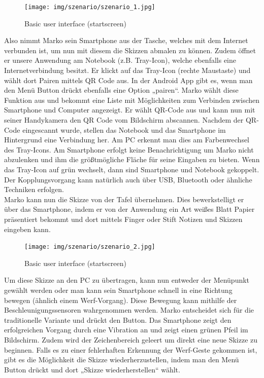 \documentclass{chi-ext}
\begin{document}
\begin{figure}
  \centering
  \texttt{[image: img/szenario/szenario\_1.jpg]}
  \caption{Basic user interface (startscreen)}
  \label{fig:mockup_startscreen}
\end{figure}

Also nimmt Marko sein Smartphone aus der Tasche, welches mit dem Internet verbunden ist, um nun mit diesem die Skizzen abmalen zu können. Zudem öffnet er unsere Anwendung am Notebook (z.B. Tray-Icon), welche ebenfalls eine Internetverbindung besitzt. Er klickt auf das Tray-Icon (rechte Maustaste) und wählt dort Pairen mittels QR Code aus. In der Android App gibt es, wenn man den Menü Button drückt ebenfalls eine Option „pairen“. Marko wählt diese Funktion aus und bekommt eine Liste mit Möglichkeiten zum Verbinden zwischen Smartphone und Computer angezeigt. Er wählt QR-Code aus und kann nun mit seiner Handykamera den QR Code vom Bildschirm abscannen. Nachdem der QR-Code eingescannt wurde, stellen das Notebook und das Smartphone im Hintergrund eine Verbindung her. Am PC erkennt man dies am Farbenwechsel des Tray-Icons. Am Smartphone erfolgt keine Benachrichtigung um Marko nicht abzulenken und ihm die größtmögliche Fläche für seine Eingaben zu bieten. Wenn das Tray-Icon auf grün wechselt, dann sind Smartphone und Notebook gekoppelt. Der Kopplungsvorgang kann natürlich auch über USB, Bluetooth oder ähnliche Techniken erfolgen.\\
Marko kann nun die Skizze von der Tafel übernehmen. Dies bewerkstelligt er über das Smartphone, indem er von der Anwendung ein Art weißes Blatt Papier präsentiert bekommt und dort mittels Finger oder Stift Notizen und Skizzen eingeben kann.

\begin{figure}
  \centering
  \texttt{[image: img/szenario/szenario\_2.jpg]}
  \caption{Basic user interface (startscreen)}
  \label{fig:mockup_startscreen}
\end{figure}

Um diese Skizze an den PC zu übertragen, kann nun entweder der Menüpunkt gewählt werden oder man kann sein Smartphone schnell in eine Richtung bewegen (ähnlich einem Werf-Vorgang). Diese Bewegung kann mithilfe der Beschleunigungssensoren wahrgenommen werden. Marko entscheidet sich für die traditionelle Variante und drückt den Button.
Das Smartphone zeigt den erfolgreichen Vorgang durch eine Vibration an und zeigt einen grünen Pfeil im Bildschirm. Zudem wird der Zeichenbereich geleert um direkt eine neue Skizze zu beginnen. Falls es zu einer fehlerhaften Erkennung der Werf-Geste gekommen ist, gibt es die Möglichkeit die Skizze wiederherzustellen, indem man den Menü Button drückt und dort „Skizze wiederherstellen“ wählt.
\end{document}
